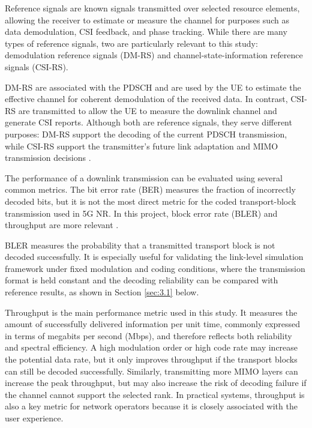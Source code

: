 \documentclass[a4paper,12pt,onecolumn]{article}
\begin{document}
	Reference signals are known signals transmitted over selected resource elements, allowing the receiver to estimate or measure the channel for purposes such as data demodulation, CSI feedback, and phase tracking. While there are many types of reference signals, two are particularly relevant to this study: demodulation reference signals (DM-RS) and	channel-state-information reference signals (CSI-RS). 
	
	DM-RS are associated with the PDSCH and are used by the UE to estimate the effective channel for coherent demodulation of the received data. In contrast, CSI-RS are transmitted to allow the UE to measure the downlink channel and generate CSI reports. Although both are reference signals, they serve different purposes: DM-RS support the decoding of the current PDSCH transmission, while CSI-RS support the transmitter's future link adaptation and MIMO transmission decisions \cite[Ch.~9]{EricssonBook}. 

	The performance of a downlink transmission can be evaluated using several common metrics. The bit error rate (BER) measures the fraction of incorrectly decoded bits, but it is not the most direct metric for the coded transport-block transmission used in 5G NR. In this project, block error rate (BLER) and throughput are more relevant \cite{3gpp_ts_38101_4}.
	
	BLER measures the probability that a transmitted transport block is not decoded
	successfully. It is especially useful for validating the link-level simulation framework under fixed modulation and coding conditions, where the transmission format is held constant and the decoding reliability can be compared with reference results, as shown in Section \ref{sec:3.1} below.

	Throughput is the main performance metric used in this study. It measures the amount of successfully delivered information per unit time, commonly expressed in terms of megabits per second (Mbps), and therefore reflects both reliability and spectral efficiency. A high modulation order or high code rate may increase the potential data rate, but it only improves throughput if the transport blocks can still be decoded successfully. Similarly, transmitting more MIMO layers can increase the peak throughput, but may also increase the risk of decoding failure if the channel cannot support the selected rank. In practical systems, throughput is also a key metric for network operators because it is closely associated with the user experience.
\end{document}
